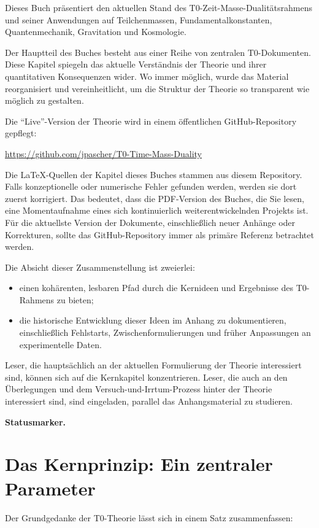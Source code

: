 	Dieses Buch präsentiert den aktuellen Stand des T0-Zeit-Masse-Dualitätsrahmens und seiner Anwendungen auf Teilchenmassen, Fundamentalkonstanten, Quantenmechanik, Gravitation und Kosmologie.
	
	Der Hauptteil des Buches besteht aus einer Reihe von zentralen T0-Dokumenten. Diese Kapitel spiegeln das aktuelle Verständnis der Theorie und ihrer quantitativen Konsequenzen wider. Wo immer möglich, wurde das Material reorganisiert und vereinheitlicht, um die Struktur der Theorie so transparent wie möglich zu gestalten.
	
	Die ``Live''-Version der Theorie wird in einem öffentlichen GitHub-Repository gepflegt:
	\begin{center}
		\url{https://github.com/jpascher/T0-Time-Mass-Duality}
	\end{center}
	
	Die \LaTeX{}-Quellen der Kapitel dieses Buches stammen aus diesem Repository. Falls konzeptionelle oder numerische Fehler gefunden werden, werden sie dort zuerst korrigiert. Das bedeutet, dass die PDF-Version des Buches, die Sie lesen, eine Momentaufnahme eines sich kontinuierlich weiterentwickelnden Projekts ist. Für die aktuellste Version der Dokumente, einschließlich neuer Anhänge oder Korrekturen, sollte das GitHub-Repository immer als primäre Referenz betrachtet werden.
	
	Die Absicht dieser Zusammenstellung ist zweierlei:
	\begin{itemize}
		\item einen kohärenten, lesbaren Pfad durch die Kernideen und Ergebnisse des T0-Rahmens zu bieten;
		\item die historische Entwicklung dieser Ideen im Anhang zu dokumentieren, einschließlich Fehlstarts, Zwischenformulierungen und früher Anpassungen an experimentelle Daten.
	\end{itemize}
	
	Leser, die hauptsächlich an der aktuellen Formulierung der Theorie interessiert sind, können sich auf die Kernkapitel konzentrieren. Leser, die auch an den Überlegungen und dem Versuch-und-Irrtum-Prozess hinter der Theorie interessiert sind, sind eingeladen, parallel das Anhangsmaterial zu studieren.

	\medskip\noindent\textbf{Statusmarker.}
	
	
	\section{Das Kernprinzip: Ein zentraler Parameter}
	Der Grundgedanke der T0-Theorie lässt sich in einem Satz zusammenfassen:
	
